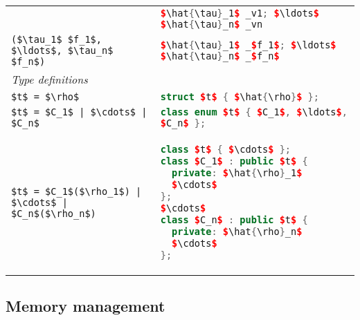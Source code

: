 \begin{table}[tp]
\begin{center}
\begin{tabular}{|p{2in}|p{3in}|}
        & \lstinline[language=c++,mathescape=true]@$\hat{\tau}_1$ _v1; $\ldots$ $\hat{\tau}_n$ _vn@ \\[0.5em]
      \lstinline[language=ASDL,mathescape=true]@($\tau_1$ $f_1$, $\ldots$, $\tau_n$ $f_n$)@
        & \lstinline[language=c++,mathescape=true]@$\hat{\tau}_1$ _$f_1$; $\ldots$ $\hat{\tau}_n$ _$f_n$@ \\[0.5em]
      \hline
      \textit{Type definitions} & \\[0.25em]
      \lstinline[language=ASDL,mathescape=true]@$t$ = $\rho$@
        & \lstinline[language=c++,mathescape=true]@struct $t$ { $\hat{\rho}$ };@ \\[0.5em]
      \lstinline[language=ASDL,mathescape=true]@$t$ = $C_1$ | $\cdots$ | $C_n$@
        & \lstinline[language=c++,mathescape=true]@class enum $t$ { $C_1$, $\ldots$, $C_n$ };@ \\[0.5em]
      \lstinline[language=ASDL,mathescape=true]@$t$ = $C_1$($\rho_1$) | $\cdots$ | $C_n$($\rho_n$)@
        &
\vspace*{-1em}
\begin{lstlisting}[language=c++,mathescape=true]
class $t$ { $\cdots$ };
class $C_1$ : public $t$ {
  private: $\hat{\rho}_1$
  $\cdots$
};
$\cdots$
class $C_n$ : public $t$ {
  private: $\hat{\rho}_n$
  $\cdots$
};
\end{lstlisting}%
      \\[0.25em]
      \hline
    \end{tabular}%
  \end{center}%
\end{table}%

\subsection{Memory management}
